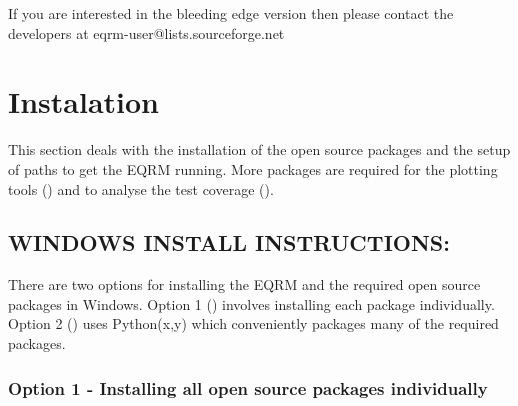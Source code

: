 \documentclass[a4paper, 12pt]{article}
\begin{document}
If you are interested in the bleeding edge version then please
contact the developers at eqrm-user@lists.sourceforge.net

\section{Instalation}

This section deals with the installation of the open source packages
and the setup of paths to get the EQRM running. More packages are
required for the plotting tools () and to
analyse the test coverage ().

\subsection{WINDOWS INSTALL INSTRUCTIONS:}

There are two options for installing the EQRM and the required open
source packages in Windows. Option 1 ()
involves installing each package individually. Option 2
() uses Python(x,y) which conveniently
packages many of the required packages.

\subsubsection{Option 1 - Installing all open source packages individually}
\label{sec:windows-option1}
\end{document}

